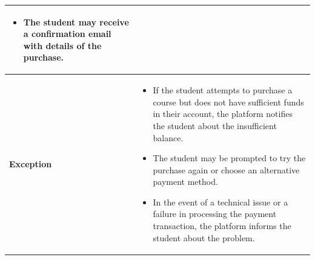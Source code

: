 \begin{table}[h!]
\begin{tabular}{|m{4cm}|m{11cm}|}
\begin{itemize}[noitemsep,topsep=0pt]
            \item The student may receive a confirmation email with details of the purchase.
        \end{itemize} \\
        \hline
        \textbf{Exception} & 
        \begin{itemize}[noitemsep,topsep=0pt]
            \item If the student attempts to purchase a course but does not have sufficient funds in their account, the platform notifies the student about the insufficient balance.
            \item The student may be prompted to try the purchase again or choose an alternative payment method.
            \item In the event of a technical issue or a failure in processing the payment transaction, the platform informs the student about the problem.
        \end{itemize} \\
        \hline
    \end{tabular}
    \egroup
\end{table}

\newpage

